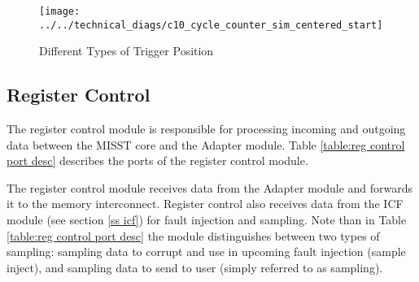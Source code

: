 \documentclass[]{report}
\begin{document}
\begin{figure}[h]
	\centering
	\texttt{[image: ../../technical\_diags/c10\_cycle\_counter\_sim\_centered\_start]}
	\caption{Different Types of Trigger Position}
	\label{fig:cyclecounterplot}
\end{figure}


\subsection{Register Control}
\label{ss reg control}

The register control module is responsible for processing incoming and outgoing data between the MISST core and the Adapter module.  Table \ref{table:reg control port desc} describes the ports of the register control module.

The register control module receives data from the Adapter module and forwards it to the memory interconnect. Register control also receives data from the ICF module (see section \ref{ss icf}) for fault injection and sampling. Note than in Table \ref{table:reg control port desc} the module distinguishes between two types of sampling: sampling data to corrupt and use in upcoming fault injection (sample inject), and sampling data to send to user (simply referred to as sampling). 
\end{document}
